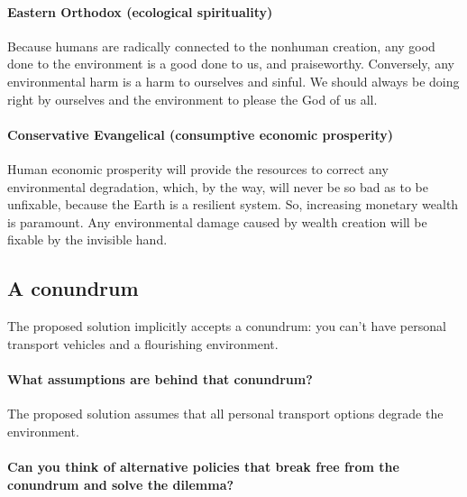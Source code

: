 \documentclass[12pt]{article}
\begin{document}
\paragraph{Eastern Orthodox (ecological spirituality)} 

Because humans are radically connected to the nonhuman creation, 
any good done to the environment is a good done to us, 
and praiseworthy. 
Conversely, any environmental harm is a harm to ourselves and sinful. 
We should always be doing right by ourselves and the environment 
to please the God of us all.

\paragraph{Conservative Evangelical (consumptive economic prosperity)} 

Human economic prosperity will provide the resources 
to correct any environmental degradation, which, 
by the way, will never be so bad as to be unfixable, 
because the Earth is a resilient system. 
So, increasing monetary wealth is paramount. 
Any environmental damage caused by wealth creation will be fixable by the invisible hand. 


\subsection{A conundrum}
\label{sec:conundrum}

The proposed solution implicitly accepts a conundrum: 
you can't have personal transport vehicles and a flourishing environment. 

\paragraph{What assumptions are behind that conundrum?} 

The proposed solution assumes that all personal transport options degrade the environment. 

\paragraph{Can you think of alternative policies that break free from the conundrum and solve the dilemma?} 
\end{document}

